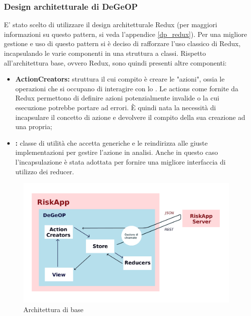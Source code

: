 	\subsubsection{Design architetturale di DeGeOP}
	E' stato scelto di utilizzare il design architetturale Redux (per maggiori informazioni su questo pattern, si veda l'appendice \ref{dp_redux}).
	Per una migliore gestione e uso di questo pattern si è deciso di rafforzare l'uso classico di Redux, incapsulando le varie componenti in una struttura a classi.
	Rispetto all'architettura base, ovvero Redux, sono quindi presenti altre componenti:
	\begin{itemize}
		\item \textbf{ActionCreators:} struttura il cui compito è creare le "azioni", ossia le operazioni che si occupano di interagire con lo . Le actions come fornite da Redux permettono di definire azioni potenzialmente invalide o la cui esecuzione potrebbe portare ad errori. È quindi nata la necessità di incapsulare il concetto di azione e devolvere il compito della sua creazione ad una  propria;
		\item \textbf{:} classe di utilità che accetta  generiche e le reindirizza alle giuste implementazioni per gestire l'azione in analisi. Anche in questo caso l'incapsulazione è stata adottata per fornire una migliore interfaccia di utilizzo dei reducer.
	\end{itemize}
	
	\begin{figure}[H]
		\label{diagramma_architettura}
		\centering
		\includegraphics[width=\textwidth]{img/ArchitetturaBase.png}
		\caption{Architettura di base}
	\end{figure}
